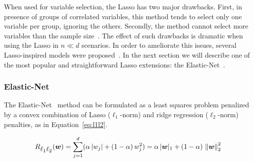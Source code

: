 			When used for variable selection, the Lasso has two major drawbacks. First, in presence of groups of correlated variables, this method tends to select only one variable per group, ignoring the others. Secondly, the method cannot select more variables than the sample size~\cite{waldmann2013evaluation, de2009regularized}.
			The effect of such drawbacks is dramatic when using the Lasso in $n \ll d$ scenarios.
			In order to ameliorate this issues, several Lasso-inspired models were proposed~\cite{meinshausen2010stability, hoggart2008simultaneous, zou2006adaptive}.
			In the next section we will describe one of the most popular and straightforward Lasso extensions: the Elastic-Net~\cite{zou2005regularization}.

			\subsubsection{Elastic-Net} \label{sec:elastic_net}
			The Elastic-Net~\cite{zou2005regularization, de2009elastic} method can be formulated as a least squares problem penalized by a convex combination of Lasso ($\ell_1$-norm) and ridge regression ($\ell_2$-norm) penalties, as in Equation~\eqref{eq:l1l2}.

			\begin{equation}\label{eq:l1l2}
				R_{\mbox{$\ell_1\ell_2$}}(\bm{w}) = \sum_{j=1}^d (\alpha\,|w_j| + (1-\alpha)\,w_j^2) = \alpha\,|\bm{w}|_1 + (1-\alpha)\,\left\lVert\bm{w}\right\rVert_2^2
			\end{equation}

